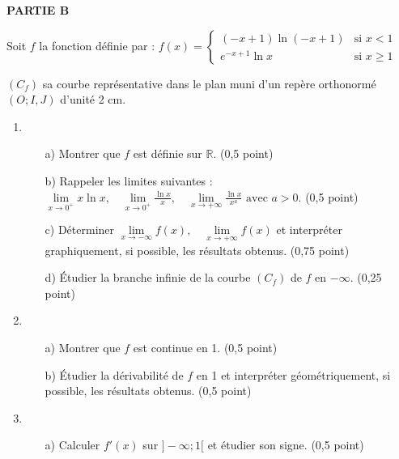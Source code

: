 \documentclass[11pt]{article}
\begin{document}
\vspace{0.4cm}
\noindent
\textbf{PARTIE B}

\noindent
Soit \( f \) la fonction définie par :
\(
f(x) = 
\begin{cases}
(-x + 1)\ln(-x + 1) & \text{si } x < 1 \\
e^{-x+1} \ln x & \text{si } x \geq 1
\end{cases}
\)

\noindent
\( (C_f) \) sa courbe représentative dans le plan muni d’un repère orthonormé \( (O; I, J) \) d’unité 2 cm.
\begin{enumerate}
\item
\begin{enumerate}
    \item[a)] Montrer que \( f \) est définie sur \( \mathbb{R} \). \hfill (0,5 point)

    \item[b)] Rappeler les limites suivantes :
    \(
    \lim\limits_{x \to 0^+} x \ln x, \quad \lim\limits_{x \to 0^+} \frac{\ln x}{x}, \quad \lim\limits_{x \to +\infty} \frac{\ln x}{x^a} \text{ avec } a > 0.
    \)
    \hfill (0,5 point)

    \item[c)] Déterminer \( \lim\limits_{x \to -\infty} f(x), \quad \lim\limits_{x \to +\infty} f(x) \) et interpréter graphiquement, si possible, les résultats obtenus. \hfill (0,75 point)

    \item[d)] Étudier la branche infinie de la courbe \( (C_f) \) de \( f \) en \( -\infty \). \hfill (0,25 point)
\end{enumerate}

\vspace{0.3cm}
\noindent
\item
\begin{enumerate}
    \item[a)] Montrer que \( f \) est continue en 1. \hfill (0,5 point)

    \item[b)] Étudier la dérivabilité de \( f \) en 1 et interpréter géométriquement, si possible, les résultats obtenus. \hfill (0,5 point)
\end{enumerate}

\vspace{0.2cm}
\noindent
\item
\begin{enumerate}
    \item[a)] Calculer \( f'(x) \) sur \( ] -\infty ; 1[ \) et étudier son signe. \hfill (0,5 point)
    

\end{enumerate}
\end{enumerate}
\end{document}
